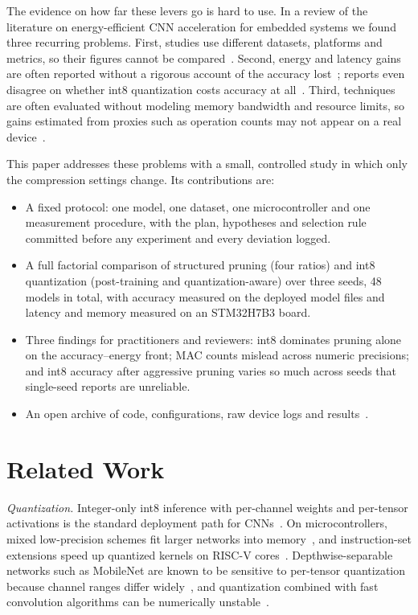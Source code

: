 \documentclass[conference]{IEEEtran}
\begin{document}
The evidence on how far these levers go is hard to use. In a review of the literature on energy-efficient CNN acceleration for embedded systems we found three recurring problems. First, studies use different datasets, platforms and metrics, so their figures cannot be compared~\cite{peccia2024gemmini,blalock2020state}. Second, energy and latency gains are often reported without a rigorous account of the accuracy lost~\cite{chung2025depthwise}; reports even disagree on whether int8 quantization costs accuracy at all~\cite{choi2022efficient,chung2025depthwise}. Third, techniques are often evaluated without modeling memory bandwidth and resource limits, so gains estimated from proxies such as operation counts may not appear on a real device~\cite{choi2022efficient,yang2017energy}.

This paper addresses these problems with a small, controlled study in which only the compression settings change. Its contributions are:
\begin{itemize}
\item A fixed protocol: one model, one dataset, one microcontroller and one measurement procedure, with the plan, hypotheses and selection rule committed before any experiment and every deviation logged.
\item A full factorial comparison of structured pruning (four ratios) and int8 quantization (post-training and quantization-aware) over three seeds, 48 models in total, with accuracy measured on the deployed model files and latency and memory measured on an STM32H7B3 board.
\item Three findings for practitioners and reviewers: int8 dominates pruning alone on the accuracy--energy front; MAC counts mislead across numeric precisions; and int8 accuracy after aggressive pruning varies so much across seeds that single-seed reports are unreliable.
\item An open archive of code, configurations, raw device logs and results~\cite{repo}.
\end{itemize}

\section{Related Work}
\textit{Quantization.} Integer-only int8 inference with per-channel weights and per-tensor activations is the standard deployment path for CNNs~\cite{jacob2018quantization,krishnamoorthi2018whitepaper}. On microcontrollers, mixed low-precision schemes fit larger networks into memory~\cite{rusci2020memory}, and instruction-set extensions speed up quantized kernels on RISC-V cores~\cite{garofalo2020xpulpnn}. Depthwise-separable networks such as MobileNet are known to be sensitive to per-tensor quantization because channel ranges differ widely~\cite{krishnamoorthi2018whitepaper,nagel2019dfq}, and quantization combined with fast convolution algorithms can be numerically unstable~\cite{mori2024wino}.
\end{document}
